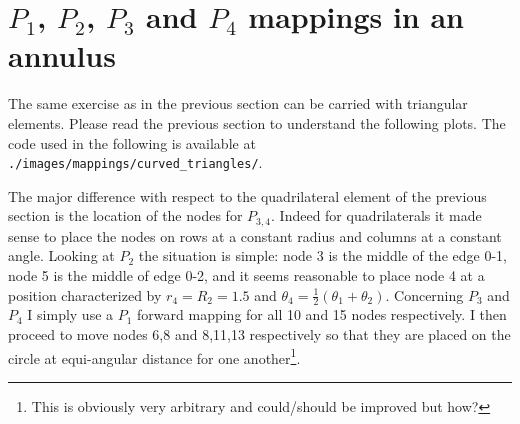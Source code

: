 \section{$P_1$, $P_2$, $P_3$ and $P_4$ mappings in an annulus }

The same exercise as in the previous section can be carried with 
triangular elements.
Please read the previous section to understand the following plots.
The code used in the following is available at {\tt ./images/mappings/curved\_triangles/}.

The major difference with respect to the quadrilateral element of the previous
section is the location of the nodes for $P_{3,4}$.
Indeed for quadrilaterals it made sense to place the nodes on rows at a constant radius
and columns at a constant angle. 
Looking at $P_2$ the situation is simple: node 3 is the middle of the edge 0-1, 
node 5 is the middle of edge 0-2, and it seems reasonable to place node 4
at a position characterized by $r_4=R_2=1.5$ and $\theta_4=\frac12(\theta_1+\theta_2)$.
Concerning $P_3$ and $P_4$ I simply use a $P_1$ forward mapping for all 10 and 
15 nodes respectively. I then proceed to move nodes 6,8 and 8,11,13 respectively 
so that they are placed on the circle at equi-angular distance for one another\footnote{This
is obviously very arbitrary and could/should be improved but how?}.

